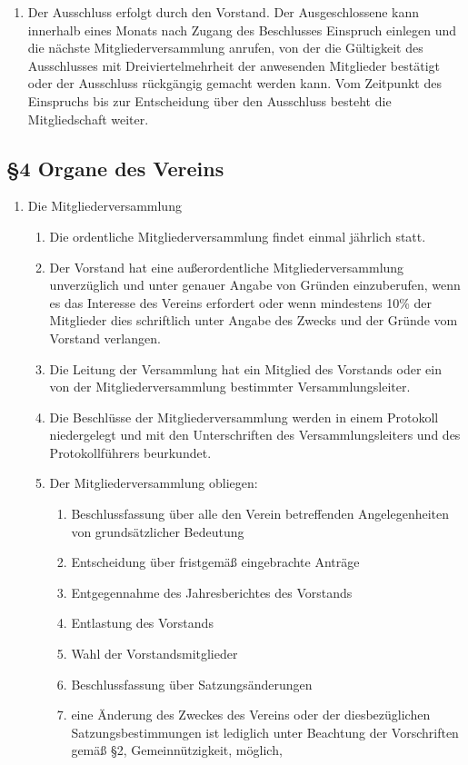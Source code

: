 \documentclass[12pt,a4paper]{article}
\begin{document}
\begin{enumerate}
\begin{enumerate}
\item Der Ausschluss erfolgt durch den Vorstand. Der Ausgeschlossene kann innerhalb eines Monats nach Zugang des Beschlusses Einspruch einlegen und die nächste Mitgliederversammlung anrufen, von der die Gültigkeit des Ausschlusses mit Dreiviertelmehrheit der anwesenden Mitglieder bestätigt oder der Ausschluss rückgängig gemacht werden kann. Vom Zeitpunkt des Einspruchs bis zur Entscheidung über den Ausschluss besteht die Mitgliedschaft weiter.
\end{enumerate}
\end{enumerate}

\subsection*{§4 Organe des Vereins}
\begin{enumerate}
\item Die Mitgliederversammlung
\begin{enumerate}
\item Die ordentliche Mitgliederversammlung findet einmal jährlich statt.
\item Der Vorstand hat eine außerordentliche Mitgliederversammlung unverzüglich und unter genauer Angabe von Gründen einzuberufen, wenn es das Interesse des Vereins erfordert oder wenn mindestens 10\% der Mitglieder dies schriftlich unter Angabe des Zwecks und der Gründe vom Vorstand verlangen.
\item Die Leitung der Versammlung hat ein Mitglied des Vorstands oder ein von der Mitgliederversammlung bestimmter Versammlungsleiter.
\item Die Beschlüsse der Mitgliederversammlung werden in einem Protokoll niedergelegt und mit den Unterschriften des Versammlungsleiters und des Protokollführers beurkundet.
\item Der Mitgliederversammlung obliegen:
\begin{enumerate}
\item Beschlussfassung über alle den Verein betreffenden Angelegenheiten von grundsätzlicher Bedeutung
\item Entscheidung über fristgemäß eingebrachte Anträge
\item Entgegennahme des Jahresberichtes des Vorstands
\item Entlastung des Vorstands
\item Wahl der Vorstandsmitglieder
\item Beschlussfassung über Satzungsänderungen
\item eine Änderung des Zweckes des Vereins oder der diesbezüglichen Satzungsbestimmungen ist lediglich unter Beachtung der Vorschriften gemäß §2, Gemeinnützigkeit, möglich, 

\end{enumerate}
\end{enumerate}
\end{enumerate}
\end{document}
